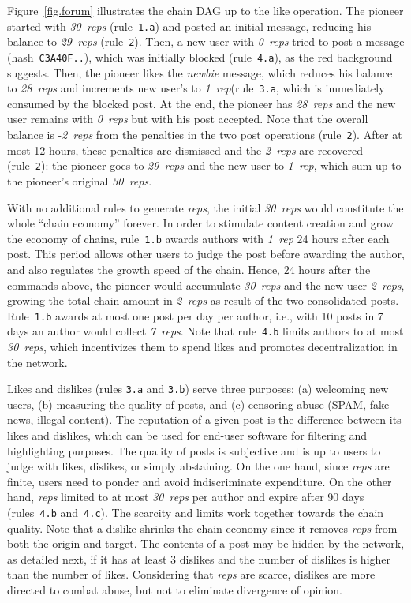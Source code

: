 \documentclass[10pt,journal,compsoc]{IEEEtran}
\newcommand{\reps}     {\emph{reps}\xspace}
\newcommand{\onerep}   {\emph{1~rep}\xspace}
\newcommand{\nreps}[1] {\emph{#1~reps\xspace}}
\begin{document}
Figure~\ref{fig.forum} illustrates the chain DAG up to the like operation.
The pioneer started with \nreps{30} (rule~\texttt{1.a}) and posted an
initial message, reducing his balance to \nreps{29} (rule~\texttt{2}).
Then, a new user with \nreps{0} tried to post a message
(hash~\texttt{C3A40F..}), which was initially blocked (rule~\texttt{4.a}), as
the red background suggests.
Then, the pioneer likes the \emph{newbie} message, which reduces his balance to
\nreps{28} and increments new user's to \onerep (rule~\texttt{3.a}, which is
immediately consumed by the blocked post.
At the end, the pioneer has \nreps{28} and the new user remains with \nreps{0}
but with his post accepted.
Note that the overall balance is -\nreps{2} from the penalties in the two post
operations (rule~\texttt{2}).
After at most 12 hours, these penalties are dismissed and the \nreps{2} are
recovered (rule~\texttt{2}):
    the pioneer goes to \nreps{29} and the new user to \onerep, which sum up to
    the pioneer's original \nreps{30}.

With no additional rules to generate \reps, the initial \nreps{30} would
constitute the whole ``chain economy'' forever.
In order to stimulate content creation and grow the economy of chains,
rule~\texttt{1.b} awards authors with \onerep 24 hours after each post.
This period allows other users to judge the post before awarding the author,
and also regulates the growth speed of the chain.
Hence, 24 hours after the commands above, the pioneer would accumulate
\nreps{30} and the new user \nreps{2}, growing the total chain amount in
\nreps{2} as result of the two consolidated posts.
Rule~\texttt{1.b} awards at most one post per day per author, i.e., with 10
posts in 7 days an author would collect \nreps{7}.
Note that rule~\texttt{4.b} limits authors to at most \nreps{30}, which
incentivizes them to spend likes and promotes decentralization in the network.

Likes and dislikes (rules \texttt{3.a} and \texttt{3.b}) serve three purposes:
    (a) welcoming new users, (b) measuring the quality of posts, and
    (c) censoring abuse (SPAM, fake news, illegal content).
%
The reputation of a given post is the difference between its likes and
dislikes, which can be used for end-user software for filtering and
highlighting purposes.
%
The quality of posts is subjective and is up to users to judge with likes,
dislikes, or simply abstaining.
On the one hand, since \reps are finite, users need to ponder and avoid
indiscriminate expenditure.
On the other hand, \reps limited to at most \nreps{30} per author and expire
after 90 days (rules~\texttt{4.b} and~\texttt{4.c}).
The scarcity and limits work together towards the chain quality.
%
Note that a dislike shrinks the chain economy since it removes \reps from both
the origin and target.
The contents of a post may be hidden by the network, as detailed next, if it
has at least 3 dislikes and the number of dislikes is higher than the number of
likes.
Considering that \reps are scarce, dislikes are more directed to combat abuse,
but not to eliminate divergence of opinion.
\end{document}
